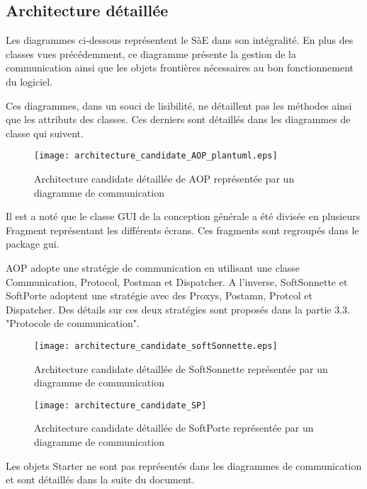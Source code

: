\subsection{Architecture détaillée}

Les diagrammes ci-dessous représentent le SàE dans son intégralité. 
En plus des classes vues précédemment, ce diagramme présente la gestion de la communication ainsi que les objets frontières nécessaires au bon fonctionnement du logiciel.

Ces diagrammes, dans un souci de lisibilité, ne détaillent pas les méthodes ainsi que les attributs des classes.
Ces derniers sont détaillés dans les diagrammes de classe qui suivent.

\begin{figure} [H]
    \centering
    \texttt{[image: architecture\_candidate\_AOP\_plantuml.eps]}
    \caption{Architecture candidate détaillée de AOP représentée par un diagramme de communication}
    \label{archiDetailleAOP}
\end{figure}

Il est a noté que le classe GUI de la conception générale a été divisée en plusieurs Fragment représentant les différents écrans.
Ces fragments sont regroupés dans le package gui.

AOP adopte une stratégie de communication en utilisant une classe Communication, Protocol, Postman et Dispatcher.
A l'inverse, SoftSonnette et SoftPorte adoptent une stratégie avec des Proxys, Postamn, Protcol et Dispatcher.
Des détails sur ces deux stratégies sont proposés dans la partie 3.3. "Protocole de communication".

\begin{figure} [H]
    \centering
    \texttt{[image: architecture\_candidate\_softSonnette.eps]}
    \caption{Architecture candidate détaillée de SoftSonnette représentée par un diagramme de communication}
    \label{archiDetailleSS}
\end{figure}



\begin{figure} [H]
    \centering
    \texttt{[image: architecture\_candidate\_SP]}
    \caption{Architecture candidate détaillée de SoftPorte représentée par un diagramme de communication}
    \label{archiDetailleSoftPorte}
\end{figure}

Les objets Starter ne sont pas représentés dans les diagrammes de communication et sont détaillés dans la suite du document.

